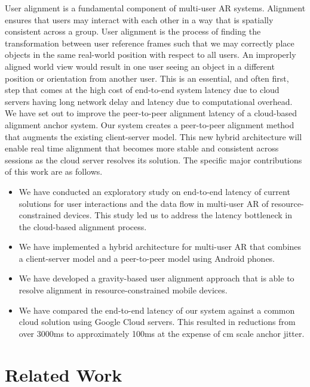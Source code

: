 \documentclass{vgtc}                          %
\begin{document}
User alignment is a fundamental component of multi-user AR systems. Alignment ensures that users may interact with each other in a way that is spatially consistent across a group. 
User alignment is the process of finding the transformation between user reference frames such that we may correctly place objects in the same real-world position with 
respect to all users. An improperly aligned world view would result in one user seeing an object in a different position or orientation from another user. This is an essential, and often first, step that comes at 
the high cost of end-to-end system latency due to cloud servers having long network delay and latency due to computational overhead. 
We have set out to improve the peer-to-peer alignment latency of a cloud-based alignment anchor system. Our system creates a peer-to-peer alignment method that augments the existing client-server model. This new hybrid architecture 
will enable real time alignment that becomes more stable and consistent across sessions as the cloud server resolves its solution. 
The specific major contributions of this work are as follows. 
\begin{itemize}
    \item We have conducted an exploratory study on end-to-end latency of current solutions for user interactions and the data flow in multi-user AR 
    of resource-constrained devices. This study led us to address the latency bottleneck in the cloud-based alignment process. 
    \item We have implemented a hybrid architecture for multi-user AR that combines a client-server model and a peer-to-peer model using Android phones.
    \item We have developed a gravity-based user alignment approach that is able to resolve alignment in resource-constrained mobile devices.  %
    \item We have compared the end-to-end latency of our system against a common cloud solution using Google Cloud servers. This 
    resulted in reductions from over 3000ms to approximately 100ms at the expense of cm scale anchor jitter.
\end{itemize}

\section{Related Work}
\end{document}
